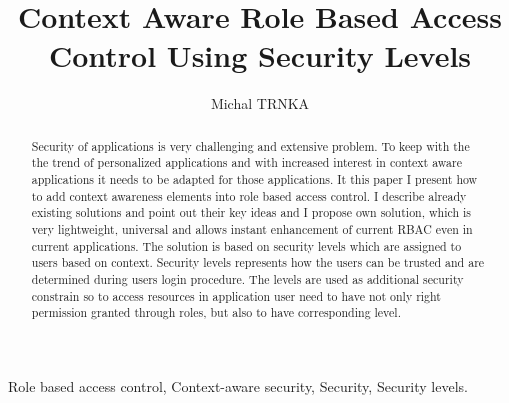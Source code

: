 \documentclass{poster15}
\begin{document}

%
\title{Context Aware Role Based Access Control Using Security Levels}
%

%
\author{Michal TRNKA}
%


\maketitle


\begin{abstract}
Security of applications is very challenging and extensive problem. To keep with the the trend of personalized applications and with increased interest in context aware applications it needs to be adapted for those applications. It this paper I present how to add context awareness elements into role based access control. I describe already existing solutions and point out their key ideas and I propose own solution, which is very lightweight, universal and allows instant enhancement of current RBAC even in current applications. The solution is based on security levels which are assigned to users based on context. Security levels represents how the users can be trusted and are determined during users login procedure. The levels are used as additional security constrain so to access resources in application user need to have not only right permission granted through roles, but also to have corresponding level.
\end{abstract}


\begin{keywords}
Role based access control, Context-aware security, Security, Security levels.
\end{keywords}
\end{document}
